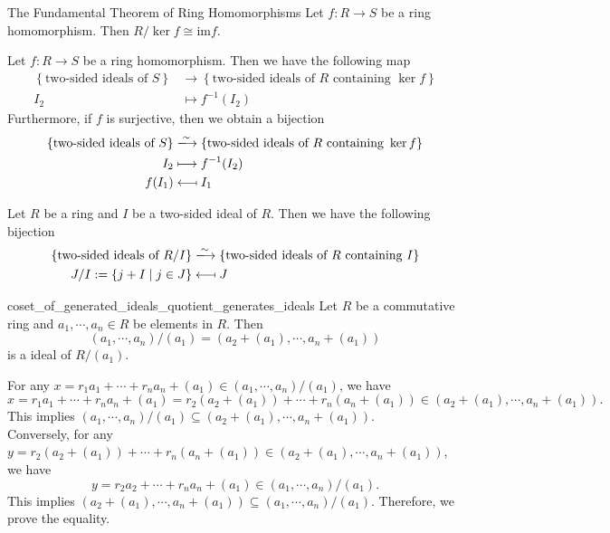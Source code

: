 \begin{theorem}{The Fundamental Theorem of Ring Homomorphisms}{}
    Let $f:R\to S$ be a ring homomorphism. Then $R/\ker f\cong \mathrm{im}f$.
\end{theorem}

\begin{proposition}{}{}
    Let $f:R\to S$ be a ring homomorphism. Then we have the following map
    \begin{align*}
       \left\{\text{two-sided ideals of }S\right\}&\longrightarrow\left\{\text{two-sided ideals of }R\text{ containing }\ker f\right\}\\
        I_2&\longmapsto f^{-1}(I_2)
    \end{align*}
    Furthermore, if $f$ is surjective, then we obtain a bijection
    \begin{align*}
        \left\{\text{two-sided ideals of }S\right\}&\xlongrightarrow{\sim}\left\{\text{two-sided ideals of }R\text{ containing }\ker f\right\}\\
        I_2&\longmapsto f^{-1}(I_2)\\
        f(I_1)&\longmapsfrom I_1
    \end{align*}
\end{proposition}


\begin{corollary}{}{}
    Let $R$ be a ring and $I$ be a two-sided ideal of $R$. Then we have the following bijection
    \begin{align*}
        \left\{\text{two-sided ideals of }R/I\right\}&\xlongrightarrow{\sim}\left\{\text{two-sided ideals of }R\text{ containing }I\right\}\\
        J/I:=\left\{j+I\mid j\in J\right\} &\longmapsfrom J
    \end{align*}
\end{corollary}


\begin{example}{}{coset_of_generated_ideals_quotient_generates_ideals}
    Let $R$ be a commutative ring and $a_1,\cdots,a_n\in R$ be elements in $R$. Then 
    \[
    \left(a_1,\cdots,a_n\right)/(a_1) = \left(a_2+(a_1),\cdots,a_n+(a_1)\right)
    \]
    is a ideal of $R/(a_1)$.
\end{example}
\begin{prf}
    For any $x=r_1a_1+\cdots+r_na_n+(a_1)\in \left(a_1,\cdots,a_n\right)/(a_1)$, we have
    \[
    x=r_1a_1+\cdots+r_na_n+(a_1)=r_2(a_2+(a_1))+\cdots+r_n(a_n+(a_1))\in \left(a_2+(a_1),\cdots,a_n+(a_1)\right).
    \]
    This implies $\left(a_1,\cdots,a_n\right)/(a_1)\subseteq \left(a_2+(a_1),\cdots,a_n+(a_1)\right)$.\\
    Conversely, for any $y=r_2(a_2+(a_1))+\cdots+r_n(a_n+(a_1))\in \left(a_2+(a_1),\cdots,a_n+(a_1)\right)$, we have
    \[
    y=r_2a_2+\cdots+r_na_n+(a_1)\in \left(a_1,\cdots,a_n\right)/(a_1).
    \]
    This implies $\left(a_2+(a_1),\cdots,a_n+(a_1)\right)\subseteq \left(a_1,\cdots,a_n\right)/(a_1)$. Therefore, we prove the equality.
\end{prf}

